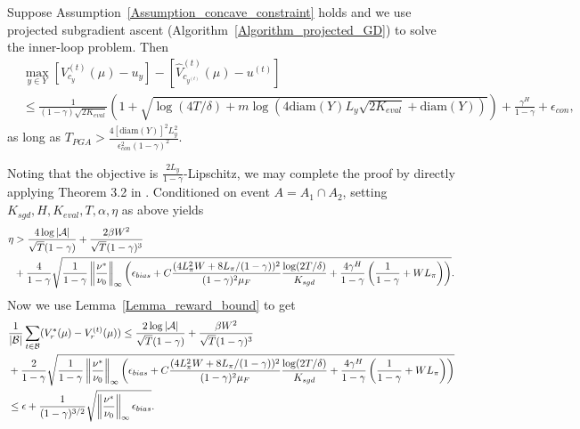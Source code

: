 \begin{lemma}\label{Lemma_constraint_violation_PGA}
    Suppose Assumption~\ref{Assumption_concave_constraint} holds and we use projected subgradient ascent (Algorithm~\ref{Algorithm_projected_GD}) to solve the inner-loop problem.
    Then 
    $$\begin{aligned}
    &\max_{y\in Y} \left[V_{c_y}^{(t)}(\mu)-u_y\right]-\left[\widehat V_{c_{y^{(t)}}}^{(t)}(\mu)-u^{(t)}\right]\\
    &\leq \frac{1}{(1-\gamma)\sqrt{2K_{eval}}}\left(1+\sqrt{\log{(4T/\delta)}+m\log(4\mathrm{diam}(Y)L_y\sqrt{2K_{eval}}+\mathrm{diam}(Y))}\right)+\frac{\gamma^H}{1-\gamma}+\epsilon_{con},
    \end{aligned}$$
    as long as $T_{PGA}>\frac{4[\mathrm{diam}(Y)]^2L_y^2}{\epsilon_{con}^2(1-\gamma)^2}
    $.
\end{lemma}
Noting that the objective is $\frac{2L_y}{1-\gamma}$-Lipschitz, we may complete the proof by directly applying Theorem 3.2 in \cite{bubeck2015convex}.
\endproof
{}
Conditioned on event $A=A_1\cap A_2$, setting $K_{sgd}, H, K_{eval}, T, \alpha, \eta$ as above yields
$$\begin{aligned}
    \eta&> \frac{4\log |{\mathcal{A}}|}{\sqrt{T}(1-\gamma)}+\frac{2\beta W^2}{\sqrt{T}(1-\gamma)^3}\\
    &+\frac{4}{1-\gamma}\sqrt{\frac{1}{1-\gamma}\left\|\frac{\nu^*}{\nu_0}\right\|_\infty\left(\epsilon_{bias}+C\frac{(4L_\pi^2W+8L_\pi/(1-\gamma))^2}{(1-\gamma)^2\mu_F}\frac{\log(2T/\delta)}{K_{sgd}}+\frac{4\gamma^H}{1-\gamma}\left(\frac{1}{1-\gamma}+WL_\pi\right)\right)}.
    \end{aligned}
$$
Now we use Lemma~\ref{Lemma_reward_bound} to get
$$
    \begin{aligned}
        &\frac{1}{|{\mathcal{B}}|}\sum_{t\in{\mathcal{B}}}(V_r^*(\mu)-V_r^{(t)}(\mu)) \leq \frac{2\log|{\mathcal{A}}|}{\sqrt{T}(1-\gamma)}+\frac{\beta W^2}{\sqrt{T}(1-\gamma)^3}\\
       &+\frac{2}{1-\gamma}\sqrt{\frac{1}{1-\gamma}\left\|\frac{\nu^*}{\nu_0}\right\|_\infty\left(\epsilon_{bias}+C\frac{(4L_\pi^2W+8L_\pi/(1-\gamma))^2}{(1-\gamma)^2\mu_F}\frac{\log(2T/\delta)}{K_{sgd}}+\frac{4\gamma^H}{1-\gamma}\left(\frac{1}{1-\gamma}+WL_\pi\right)\right)}\\
       &\leq \epsilon+\frac{1}{(1-\gamma)^{3/2}}\sqrt{\left\|\frac{\nu^*}{\nu_0}\right\|_\infty\epsilon_{bias}}.
    \end{aligned}
    $$
